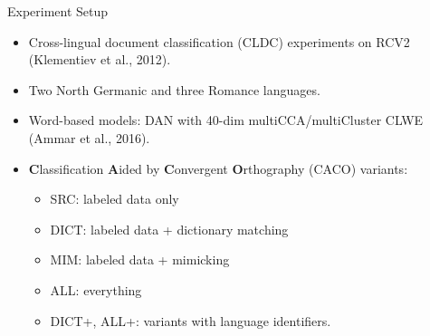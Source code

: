 \documentclass[compress]{beamer}
\begin{document}
\begin{frame}{Experiment Setup}

\begin{itemize}

\item Cross-lingual document classification (CLDC) experiments on RCV2 (Klementiev et al., 2012).
\item Two North Germanic and three Romance languages.
\item Word-based models: DAN with 40-dim multiCCA/multiCluster CLWE (Ammar et al., 2016).
\item {\bf C}lassification {\bf A}ided by {\bf C}onvergent {\bf
O}rthography (CACO) variants:
\begin{itemize}
\item SRC: labeled data only
\item DICT: labeled data + dictionary matching
\item MIM: labeled data + mimicking
\item ALL: everything
\item DICT+, ALL+: variants with language identifiers.
\end{itemize}

\end{itemize}

\end{frame}
\end{document}
